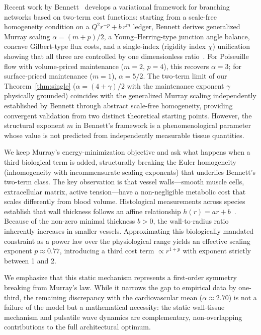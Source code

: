 \documentclass[11pt,a4paper]{article}
\theoremstyle{remark}
\begin{document}
Recent work by Bennett~\cite{bennett2025} develops a variational
framework for branching networks based on two-term cost functions: starting
from a scale-free homogeneity condition on a $Q^2 r^{-p} + b\,r^m$ ledger,
Bennett derives generalized Murray scaling $\alpha=(m{+}p)/2$, a
Young--Herring-type junction angle balance, concave Gilbert-type flux costs,
and a single-index (rigidity index $\chi$) unification showing that all three
are controlled by one dimensionless ratio~\cite{bennett2025}. For Poiseuille
flow with volume-priced maintenance ($m=2$, $p=4$), this recovers $\alpha=3$;
for surface-priced maintenance ($m=1$), $\alpha=5/2$. The two-term limit of
our Theorem~\ref{thm:single} ($\alpha = (4{+}\gamma)/2$ with the maintenance
exponent $\gamma$ physically grounded) coincides with the generalized Murray
scaling independently established by Bennett through abstract scale-free
homogeneity, providing convergent validation from two distinct theoretical
starting points. However, the structural exponent $m$ in Bennett's framework
is a phenomenological parameter whose value is not predicted from independently
measurable tissue quantities.

We keep Murray's energy-minimization objective and ask what happens when
a third biological term is added, structurally breaking the Euler homogeneity
(inhomogeneity with incommensurate scaling exponents) that underlies Bennett's
two-term class. The key observation is that vessel walls---smooth muscle
cells, extracellular matrix, active tension---have a non-negligible metabolic
cost that scales differently from blood volume. Histological measurements
across species establish that wall thickness follows an affine relationship 
$h(r) = ar + b$~\cite{Guo2003,WolinskyGlagov1967}. Because of the non-zero 
minimal thickness $b>0$, the wall-to-radius ratio inherently increases in smaller 
vessels. Approximating this biologically mandated constraint as a power law over 
the physiological range yields an effective scaling exponent $p \approx 0.77$,
introducing a third cost term $\propto r^{1+p}$ with exponent strictly between
1 and 2.

We emphasize that this static mechanism represents a first-order symmetry
breaking from Murray's law. While it narrows the gap to empirical data by
one-third, the remaining discrepancy with the cardiovascular mean
($\alpha \approx 2.70$) is not a failure of the model but a mathematical
necessity: the static wall-tissue mechanism and pulsatile wave dynamics are
complementary, non-overlapping contributions to the full architectural optimum.
\end{document}

